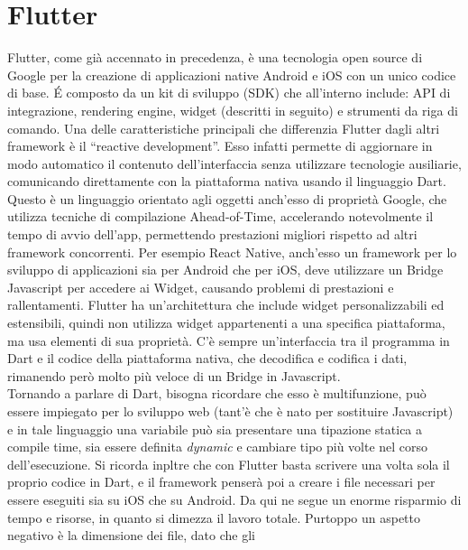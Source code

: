 \chapter{Flutter}
	Flutter, come già accennato in precedenza, è una tecnologia open source di Google
	per la creazione di applicazioni native Android e iOS con un unico codice di base.
	\'E composto da un kit di sviluppo (SDK) che all’interno include: API di integrazione,
	rendering engine, widget (descritti in seguito) e strumenti da riga di comando. Una delle
	caratteristiche principali che differenzia Flutter dagli altri framework è il
	“reactive development”. Esso infatti permette di aggiornare in modo automatico il
	contenuto dell’interfaccia senza utilizzare tecnologie ausiliarie, comunicando
	direttamente con la piattaforma nativa usando il linguaggio Dart. Questo è un
	linguaggio orientato agli oggetti anch’esso di proprietà Google, che utilizza tecniche di
	compilazione Ahead-of-Time, accelerando notevolmente il tempo di avvio
	dell’app, permettendo prestazioni migliori rispetto ad altri framework
	concorrenti. Per esempio React Native, anch’esso un framework per lo sviluppo
	di applicazioni sia per Android che per iOS, deve utilizzare un Bridge
	Javascript per accedere ai Widget,
	causando problemi di prestazioni e rallentamenti.
	Flutter ha un'architettura che include widget personalizzabili ed
	estensibili, quindi non utilizza widget appartenenti a una specifica
	piattaforma, ma usa elementi
	di sua proprietà. C’è sempre un’interfaccia tra il programma in Dart e il codice
	della piattaforma nativa, che  decodifica e codifica i dati, rimanendo però molto più
	veloce di un Bridge in Javascript. \\
	Tornando a parlare di Dart, bisogna ricordare che esso è multifunzione, può
	essere impiegato per lo sviluppo web (tant'è che è nato
	per sostituire Javascript) e in tale linguaggio una variabile può sia
	presentare una tipazione statica a compile time, sia essere definita
	\textit{dynamic} e cambiare tipo più
	volte nel corso dell'esecuzione. Si ricorda inpltre che con Flutter basta
	scrivere una volta sola
	il proprio codice in Dart, e il framework penserà poi a creare i file
	necessari per essere eseguiti sia su iOS che su Android. Da qui ne segue un
	enorme risparmio di tempo e risorse, in quanto si dimezza il lavoro totale.
	Purtoppo un aspetto negativo è la dimensione dei file, dato che gli
